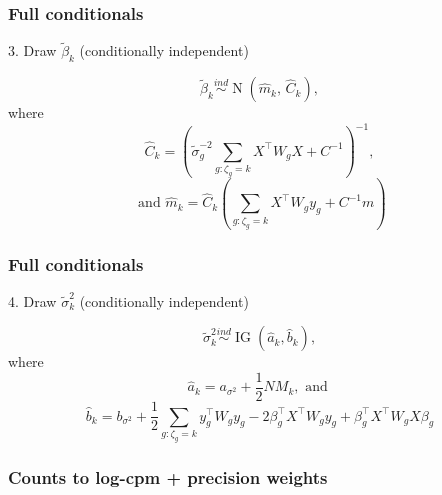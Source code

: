 \documentclass{beamer}
\newcommand{\op}{\operatorname}
\newcommand{\ind}{\stackrel{ind}{\sim}}
\begin{document}
\begin{frame}[label=current]
\frametitle{Full conditionals}
3. Draw $\tilde{\beta}_k$ (conditionally independent)

\[\tilde{\beta}_k \ind \op{N}(\hat{m}_k,\, \hat{C}_k),\]
where
\[\hat{C}_k= \left( \tilde{\sigma}^{-2}_g\sum_{g:\zeta_g=k}
  X^\top W_g X + C^{-1} \right)^{-1},\]
\[\mbox{ and }\hat{m}_k=\hat{C}_k \left(\sum_{g:\zeta_g=k} X^\top W_g y_g +
      C^{-1}m \right)\]
      
\end{frame}

\begin{frame}[label=current]
\frametitle{Full conditionals}
4. Draw $\tilde{\sigma}_k^2$ (conditionally independent)

\[\tilde{\sigma}_k^2 \ind \op{IG}(\hat{a}_k,\hat{b}_k),\]
where
\[\hat{a}_k = a_{\sigma^2} + \frac{1}{2}NM_k,\mbox{ and }\]
\[\hat{b}_k= b_{\sigma^2} + \frac{1}{2}\sum_{g:\zeta_g=k}y_g^\top W_g y_g -2 \beta_g^\top X^\top W_g y_g  +\beta_g^\top X^\top W_g X \beta_g\]
\end{frame}


\begin{frame}[label=current]
\frametitle{Counts to log-cpm + precision weights}
\end{frame}
\end{document}
